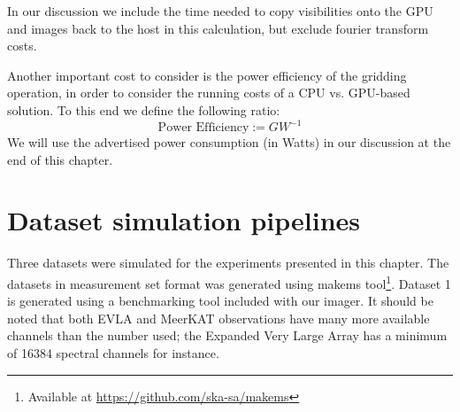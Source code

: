 In our discussion we include the time needed to copy visibilities onto the GPU and images back to the host in this calculation, but exclude fourier transform costs.

Another important cost to consider is the power efficiency of the gridding operation, in order to consider the running costs of a CPU vs. GPU-based solution.
To this end we define the following ratio:
\begin{equation}
 \text{Power Efficiency} := GW^{-1}
\end{equation}
We will use the advertised power consumption (in Watts) in our discussion at the end of this chapter.
\section{Dataset simulation pipelines}
Three datasets were simulated for the experiments presented in this chapter. The datasets in measurement set format was generated using makems tool\footnote{Available at
\url{https://github.com/ska-sa/makems}}. Dataset 1 is generated using a benchmarking tool included with our imager. It should be noted that both EVLA and MeerKAT observations
have many more available channels than the number used; the Expanded Very Large Array has a minimum of 16384 spectral channels\cite{2041-8205-739-1-L1} for instance.

